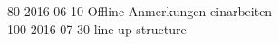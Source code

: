 \begin{footnotesize}
80	2016-06-10	Offline Anmerkungen einarbeiten\\
100	2016-07-30	line-up structure\\

\end{footnotesize}
